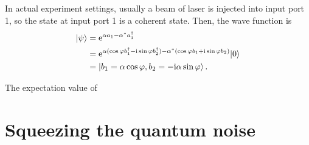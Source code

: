 \documentclass[hyperref, a4paper]{article}
\newcommand*{\ii}{\mathrm{i}}
\newcommand*{\ee}{\mathrm{e}}
\begin{document}
In actual experiment settings,
usually a beam of laser is injected into input port 1,
so the state at input port 1 is a coherent state.
Then, the wave function is 
\begin{equation}
    \begin{aligned}
        \ket{\psi} &= \ee^{\alpha a_1 - \alpha^* a_1^\dagger} \\
        &= \ee^{\alpha (\cos \varphi b_1^\dagger - \ii \sin \varphi b_2^\dagger) -\alpha^{*} (\cos \varphi b_1 + \ii \sin \varphi b_2)}|0\rangle \\
        &= \ket{b_1 = \alpha \cos \varphi, b_2 = - \ii \alpha \sin \varphi} .
    \end{aligned}
    \label{eq:out-state}
\end{equation}

The expectation value of 

\section{Squeezing the quantum noise}\label{sec:squeezing}





\end{document}
